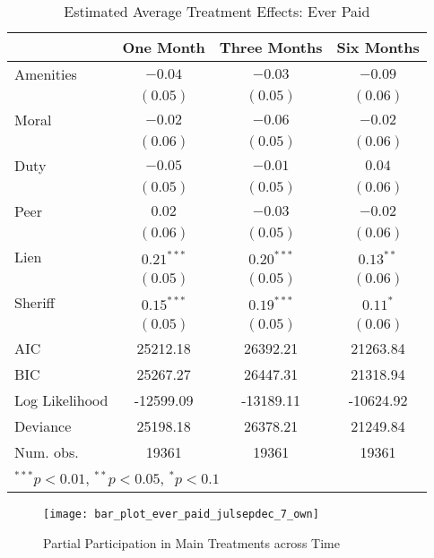 \documentclass[12pt,titlepage]{article}
\begin{document}
\begin{table}[htbp]
\caption{Estimated Average Treatment Effects: Ever Paid}
\begin{center}
\begin{tabular}{l c c c }
\hline
               & One Month & Three Months & Six Months \\
\hline
Amenities      & $-0.04$      & $-0.03$      & $-0.09$     \\
               & $(0.05)$     & $(0.05)$     & $(0.06)$    \\
Moral          & $-0.02$      & $-0.06$      & $-0.02$     \\
               & $(0.06)$     & $(0.05)$     & $(0.06)$    \\
Duty           & $-0.05$      & $-0.01$      & $0.04$      \\
               & $(0.05)$     & $(0.05)$     & $(0.06)$    \\
Peer           & $0.02$       & $-0.03$      & $-0.02$     \\
               & $(0.06)$     & $(0.05)$     & $(0.06)$    \\
Lien           & $0.21^{***}$ & $0.20^{***}$ & $0.13^{**}$ \\
               & $(0.05)$     & $(0.05)$     & $(0.06)$    \\
Sheriff        & $0.15^{***}$ & $0.19^{***}$ & $0.11^{*}$  \\
               & $(0.05)$     & $(0.05)$     & $(0.06)$    \\
\hline
AIC            & 25212.18     & 26392.21     & 21263.84    \\
BIC            & 25267.27     & 26447.31     & 21318.94    \\
Log Likelihood & -12599.09    & -13189.11    & -10624.92   \\
Deviance       & 25198.18     & 26378.21     & 21249.84    \\
Num. obs.      & 19361        & 19361        & 19361       \\
\hline
\multicolumn{4}{l}{\scriptsize{$^{***}p<0.01$, $^{**}p<0.05$, $^*p<0.1$}}
\end{tabular}
\label{tbl:reg7_ep}
\end{center}
\end{table}

\begin{figure}[htpb]
\begin{center}
\caption{Partial Participation in Main Treatments across Time}
\label{fig:ep_time_7_own}
\bigskip
\texttt{[image: bar\_plot\_ever\_paid\_julsepdec\_7\_own]}
\end{center}
\end{figure}
\end{document}
